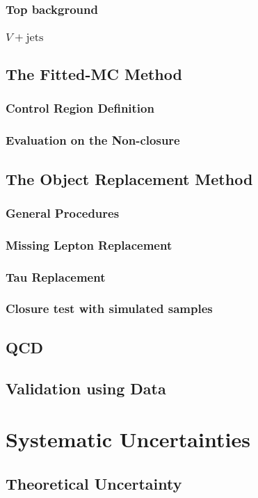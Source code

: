 		\subsubsection{Top background}
		\subsubsection{$V+\mathrm{jets}$}
	\subsection{The Fitted-MC Method}		
		\subsubsection{Control Region Definition}
		\subsubsection{Evaluation on the Non-closure}
	\subsection{The Object Replacement Method}
		\subsubsection{General Procedures}
		\subsubsection{Missing Lepton Replacement}
		\subsubsection{Tau Replacement}
		\subsubsection{Closure test with simulated samples}
	\subsection{QCD}
	\subsection{Validation using Data}
%
\section{Systematic Uncertainties} 
	\subsection{Theoretical Uncertainty}
